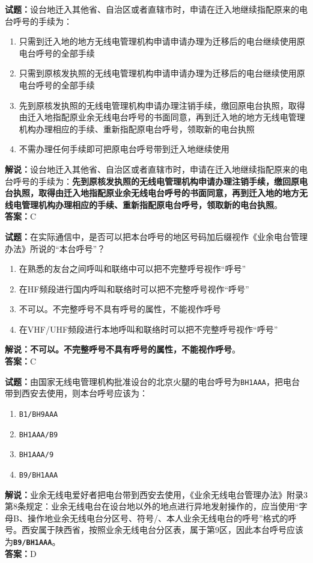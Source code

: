 \documentclass{ctexbook}
\begin{document}
\bigskip


\noindent\textbf{试题：}设台地迁入其他省、自治区或者直辖市时，申请在迁入地继续指配原来的电台呼号的手续为：
\begin{enumerate}[leftmargin=3em]
	\item 只需到迁入地的地方无线电管理机构申请申请办理为迁移后的电台继续使用原电台呼号的全部手续
	\item 只需到原核发执照的无线电管理机构申请申请办理为迁移后的电台继续使用原电台呼号的全部手续
	\item 先到原核发执照的无线电管理机构申请办理注销手续，缴回原电台执照，取得由迁入地指配原业余无线电台呼号的书面同意，再到迁入地的地方无线电管理机构办理相应的手续、重新指配原电台呼号，领取新的电台执照
	\item 不需办理任何手续即可把原电台呼号带到迁入地继续使用
\end{enumerate}
\noindent\textbf{解说：}设台地迁入其他省、自治区或者直辖市时，申请在迁入地继续指配原来的电台呼号的手续为：\textbf{先到原核发执照的无线电管理机构申请办理注销手续，缴回原电台执照，取得由迁入地指配原业余无线电台呼号的书面同意，再到迁入地的地方无线电管理机构办理相应的手续、重新指配原电台呼号，领取新的电台执照}。\\\noindent\textbf{答案：}C




\bigskip


\noindent\textbf{试题：}在实际通信中，是否可以把本台呼号的地区号码加后缀视作《业余电台管理办法》所说的“本台呼号”？
\begin{enumerate}[leftmargin=3em]
	\item 在熟悉的友台之间呼叫和联络中可以把不完整呼号视作“呼号”
	\item 在HF频段进行国内呼叫和联络时可以把不完整呼号视作“呼号”
	\item 不可以。不完整呼号不具有呼号的属性，不能视作呼号
	\item 在VHF/UHF频段进行本地呼叫和联络时可以把不完整呼号视作“呼号”
\end{enumerate}
\textbf{解说：不可以。不完整呼号不具有呼号的属性，不能视作呼号}。\\\noindent\textbf{答案：}C


\bigskip


\noindent\textbf{试题：}由国家无线电管理机构批准设台的北京火腿的电台呼号为\texttt{BH1AAA}，把电台带到西安去使用，则本台呼号应该为：
\begin{enumerate}[leftmargin=3em]
	\item \texttt{B1/BH9AAA}
	\item \texttt{BH1AAA/B9}
	\item \texttt{BH1AAA/9}
	\item \texttt{B9/BH1AAA}
\end{enumerate}
\noindent\textbf{解说：}业余无线电爱好者把电台带到西安去使用，《业余无线电台管理办法》附录3第8条规定：业余无线电台在设台地以外的地点进行异地发射操作的，应当使用“字母B、操作地业余无线电台分区号、符号/、本人业余无线电台的呼号”格式的呼号。西安属于陕西省，按照业余无线电台分区表，属于第9区，因此本台呼号应该为\texttt{\textbf{B9/BH1AAA}}。\\\noindent\textbf{答案：}D
\end{document}
